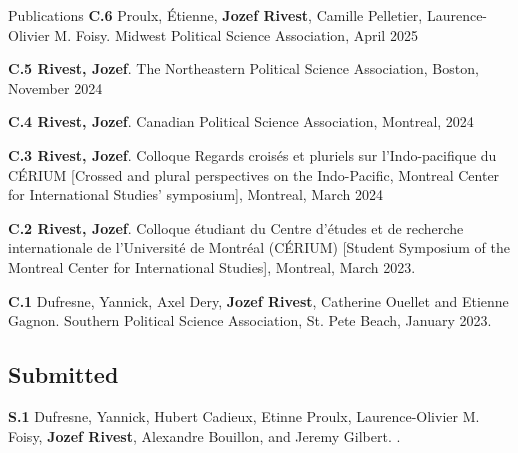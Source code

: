 \documentclass{resume} %
\begin{document}
\begin{rSection}{Publications}
{\textbf{C.6} Proulx, Étienne, \textbf{Jozef Rivest}, Camille Pelletier, Laurence-Olivier M. Foisy.  Midwest Political Science Association, {April 2025}}

{\textbf{C.5 Rivest, Jozef}.  The Northeastern Political Science Association, Boston, November 2024}

{\textbf{C.4 Rivest, Jozef}.  Canadian Political Science Association, Montreal, 2024} \par

{\textbf{C.3 Rivest, Jozef}.  Colloque Regards croisés et pluriels sur l'Indo-pacifique du CÉRIUM [Crossed and plural perspectives on the Indo-Pacific, Montreal Center for International Studies' symposium], Montreal, March 2024} \par

{\textbf{C.2 Rivest, Jozef}.  Colloque étudiant du Centre d’études et de recherche internationale de l’Université de Montréal (CÉRIUM) [Student Symposium of the Montreal Center for International Studies], Montreal, March 2023.} \par

{\textbf{C.1} Dufresne, Yannick, Axel Dery, \textbf{Jozef Rivest}, Catherine Ouellet and Etienne Gagnon.  Southern Political Science Association, St. Pete Beach, January 2023.}

\subsection*{Submitted}

{\textbf{S.1} Dufresne, Yannick, Hubert Cadieux, Etinne Proulx, Laurence-Olivier M. Foisy, \textbf{Jozef Rivest}, Alexandre Bouillon, and Jeremy Gilbert. .}


\end{rSection}
\end{document}
